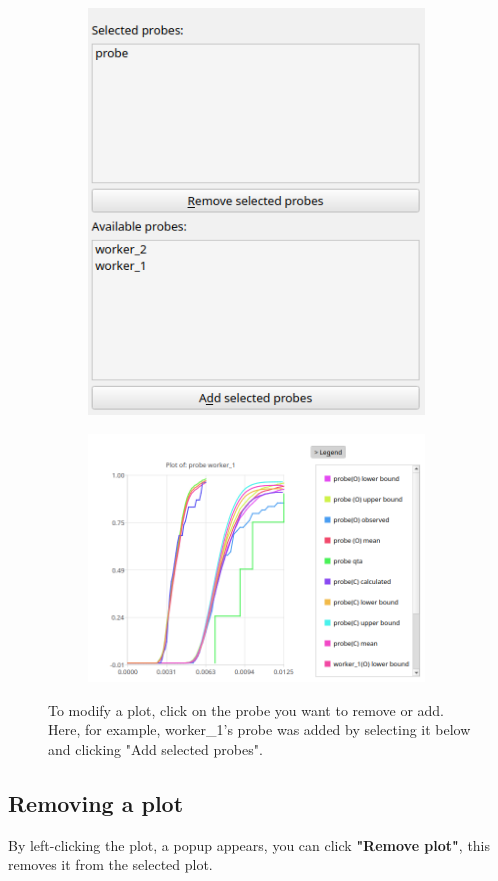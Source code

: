         \begin{figure}[H]
            \centering
            \begin{subfigure}{.5\textwidth}
                \centering
                \includegraphics[width=0.98\textwidth]{img/manual/modify_plot.png}
            \end{subfigure}%
            \begin{subfigure}{.5\textwidth}
                \centering
                \includegraphics[width =0.98\textwidth]{img/manual/added_plot.png}
            \end{subfigure}
            \caption{To modify a plot, click on the probe you want to remove or add. Here, for example, worker\_1's probe was added by selecting it below and clicking "Add selected probes".}
        \end{figure}

\subsection{Removing a plot}
    By left-clicking the plot, a popup appears, you can click \textbf{"Remove plot"}, this removes it from the selected plot.


